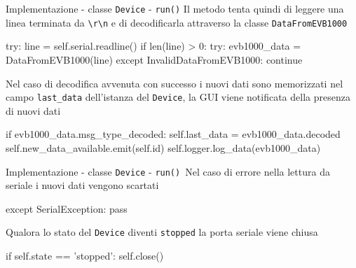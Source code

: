   
\begin{frame}[fragile, shrink=20]{Implementazione - classe \lstinline!Device! - \lstinline!run()!}
  Il metodo tenta quindi di leggere una linea terminata da \lstinline!\r\n!
  e di decodificarla attraverso la classe \lstinline!DataFromEVB1000!
  \begin{Python}
           try:
                line = self.serial.readline()
                if len(line) > 0:
                    try:
                        evb1000_data = DataFromEVB1000(line)
                    except InvalidDataFromEVB1000:
                        continue
  \end{Python}
  Nel caso di decodifica avvenuta con successo i nuovi dati sono memorizzati
  nel campo \lstinline!last_data! dell'istanza del \lstinline!Device!, la GUI
  viene notificata della presenza di nuovi dati
    \begin{Python}
                    if evb1000_data.msg_type_decoded:
                        self.last_data = evb1000_data.decoded
                        self.new_data_available.emit(self.id)
                        self.logger.log_data(evb1000_data)
    \end{Python}
\end{frame}

\begin{frame}[fragile, shrink=20]{Implementazione - classe \lstinline!Device! - \lstinline!run()!}\
  Nel caso di errore nella lettura da seriale i nuovi dati vengono scartati
  \begin{Python}
            except SerialException:
                pass
  \end{Python}

  Qualora lo stato del \lstinline!Device! diventi \lstinline!stopped!
  la porta seriale viene chiusa
  \begin{Python}
        if self.state == 'stopped':
            self.close()

  \end{Python}
\end{frame}

